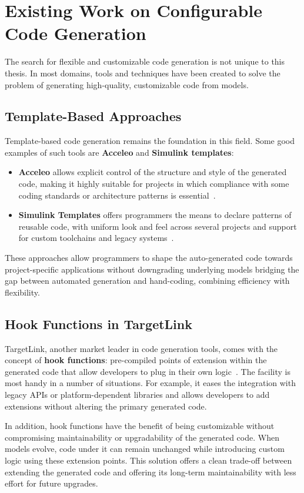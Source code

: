 \section{Existing Work on Configurable Code Generation} \label{sec:configurable_generation}

The search for flexible and customizable code generation is not unique to this thesis. In most domains, tools and techniques have been created to solve the problem of generating high-quality, customizable code from models.

\subsection*{Template-Based Approaches}

Template-based code generation remains the foundation in this field. Some good examples of such tools are \textbf{Acceleo} and \textbf{Simulink templates}: 

\begin{itemize} 
	\item \textbf{Acceleo} allows explicit control of the structure and style of the generated code, making it highly suitable for projects in which compliance with some coding standards or architecture patterns is essential~\cite{AcceleoUserGuide}. 
	\item \textbf{Simulink Templates} offers programmers the means to declare patterns of reusable code, with uniform look and feel across several projects and support for custom toolchains and legacy systems~\cite{simulink_templates}.
\end{itemize}

These approaches allow programmers to shape the auto-generated code towards project-specific applications without downgrading underlying models bridging the gap between automated generation and hand-coding, combining efficiency with flexibility.

\subsection*{Hook Functions in TargetLink}

TargetLink, another market leader in code generation tools, comes with the concept of \textbf{hook functions}: pre-compiled points of extension within the generated code that allow developers to plug in their own logic~\cite{target_link_features}. The facility is most handy in a number of situations. For example, it eases the integration with legacy APIs or platform-dependent libraries and allows developers to add extensions without altering the primary generated code.
\par
In addition, hook functions have the benefit of being customizable without compromising maintainability or upgradability of the generated code. When models evolve, code under it can remain unchanged while introducing custom logic using these extension points. This solution offers a clean trade-off between extending the generated code and offering its long-term maintainability with less effort for future upgrades.

